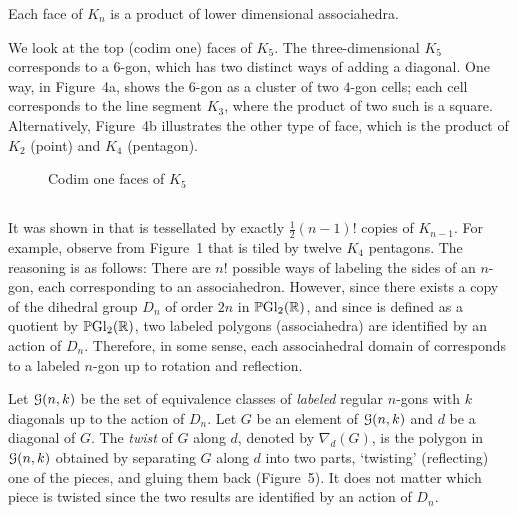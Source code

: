 \documentclass[10pt]{amsart}
\begin{document}
\begin{prop} \textup{\cite[\S2]{jds}} \label{p:product}
Each face of $K_n$ is a product of lower dimensional associahedra.
\end{prop}

\begin{exmp}
We look at the top (codim one) faces of $K_5$. The three-dimensional $K_5$ corresponds to a 6-gon, which has two distinct ways of adding a diagonal.  One way, in Figure~4a, shows the $6$-gon as a cluster of two $4$-gon cells; each cell corresponds to the line segment $K_3$, where the product of two such is a square. Alternatively, Figure~4b illustrates the other type of face, which is the product of $K_2$ (point) and $K_4$ (pentagon).
\end{exmp}

\begin{figure} [h]
\caption{Codim one faces of $K_5$}
\label{k5codim1}
\end{figure}


\subsection{}
It was shown in \cite[\S2]{dev} that  is tessellated by exactly $\frac{1}{2}(n-1)!$ copies of $K_{n-1}$. For example, observe from Figure~1 that  is tiled by twelve $K_4$ pentagons.  The reasoning is as follows: There are $n!$ possible ways of labeling the sides of an $n$-gon, each corresponding to an associahedron.  However, since there exists a copy of the dihedral group $D_n$ of order $2n$ in ${\mathbb P} {\rm Gl}_2({\mathbb R})$, and since  is defined as a quotient by ${\mathbb P} {\rm Gl}_2({\mathbb R})$, two labeled polygons (associahedra) are identified by an action of $D_n$. Therefore, in some sense, each associahedral domain of  corresponds to a labeled $n$-gon up to rotation and reflection.

\begin{defn}
Let ${\mathcal G}(n,k)$ be the set of equivalence classes of {\em labeled} regular $n$-gons with $k$ diagonals up to the action of $D_n$. Let $G$ be an element of ${\mathcal G}(n,k)$ and $d$ be a diagonal of $G$.  The {\em twist} of $G$ along $d$, denoted by $\nabla_d(G)$, is the polygon in ${\mathcal G}(n,k)$ obtained by separating $G$ along $d$ into two parts, `twisting' (reflecting) one of the pieces, and gluing them back (Figure~5).  It does not matter which piece is twisted since the two results are identified by an action of $D_n$.
\end{defn}
\end{document}
